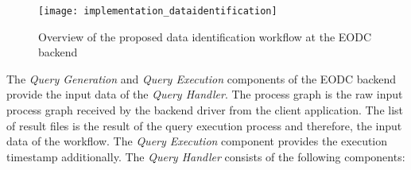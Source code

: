 \documentclass[draft,final]{vutinfth} %
\begin{document}
\begin{figure}[h]
	\centering
	\texttt{[image: implementation\_dataidentification]}
	\caption{Overview of the proposed data identification workflow at the EODC backend}
	\label{fig:impldataid} %
\end{figure}

The \textit{Query Generation} and \textit{Query Execution} components of the EODC backend provide the input data of the \textit{Query Handler}. The process graph is the raw input process graph received by the backend driver from the client application. The list of result files is the result of the query execution process and therefore, the input data of the workflow. The \textit{Query Execution} component provides the execution timestamp additionally. The \textit{Query Handler} consists of the following components:
\end{document}
